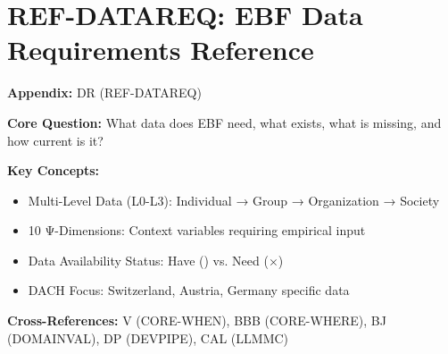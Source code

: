 \chapter{REF-DATAREQ: EBF Data Requirements Reference}
\label{app:dr}


\begin{tcolorbox}[colback=blue!5!white, colframe=blue!75!black,
    title=Quick Reference: Appendix UNMAPPED_DR]

\textbf{Appendix:} DR (REF-DATAREQ)

\textbf{Core Question:} What data does EBF need, what exists, what is missing, and how current is it?

\textbf{Key Concepts:}
\begin{itemize}[nosep]
\item Multi-Level Data (L0-L3): Individual → Group → Organization → Society
\item 10 Ψ-Dimensions: Context variables requiring empirical input
\item Data Availability Status: Have (\checkmark) vs. Need ($\times$)
\item DACH Focus: Switzerland, Austria, Germany specific data
\end{itemize}

\textbf{Cross-References:} V (CORE-WHEN), BBB (CORE-WHERE), BJ (DOMAINVAL), DP (DEVPIPE), CAL (LLMMC)
\end{tcolorbox}


\begin{abstract}
This appendix provides the comprehensive data requirements inventory for the Evidence-Based Framework (EBF). It documents all data needs across four hierarchical levels (L0: Individual, L1: Group, L2: Organization, L3: Society) and ten context dimensions ($\Psi$). For each data requirement, we specify: (1) what data is needed, (2) whether it currently exists, (3) primary data sources, (4) last update date, and (5) collection methodology. Special attention is given to DACH-region (Switzerland, Austria, Germany) empirical values with validated sources.
\end{abstract}


